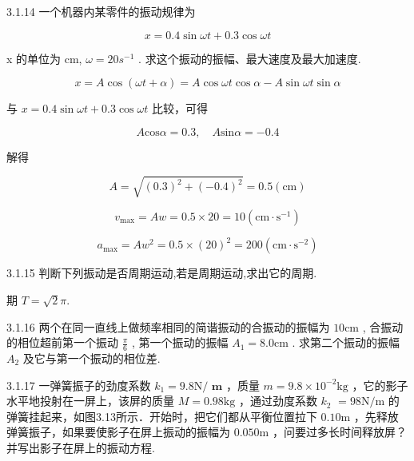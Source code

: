 \begin{problem}{3.1.14}
一个机器内某零件的振动规律为

\[
x = 0. 4 \sin \omega t + 0. 3 \cos \omega t
\]

x 的单位为 cm, $\omega = 20s^{-1}$ . 求这个振动的振幅、最大速度及最大加速度.

\[
x = A \cos (\omega t + \alpha) = A \cos \omega t \cos \alpha - A \sin \omega t \sin \alpha
\]

与 $x = 0.4\sin \omega t + 0.3\cos \omega t$ 比较，可得

\[
A \mathrm{cos} \alpha = 0. 3, \quad A \mathrm{sin} \alpha = - 0. 4
\]

解得

\[
A = \sqrt {(0 . 3) ^ {2} + (- 0 . 4) ^ {2}} = 0. 5 (\mathrm{cm})
\]

\[
v _ {\max} = A w = 0. 5 \times 2 0 = 1 0 (\mathrm{cm} \cdot \mathrm{s} ^ {- 1})
\]

\[
a _ {\max} = A w ^ {2} = 0. 5 \times (2 0) ^ {2} = 2 0 0 (\mathrm{cm} \cdot \mathrm{s} ^ {- 2})
\]
\end{problem}
\clearpage


\begin{problem}{3.1.15}
判断下列振动是否周期运动,若是周期运动,求出它的周期.

期 $T = \sqrt{2}\pi .$
\end{problem}
\clearpage


\begin{problem}{3.1.16}
两个在同一直线上做频率相同的简谐振动的合振动的振幅为 $10\mathrm{cm}$ , 合振动的相位超前第一个振动 $\frac{\pi}{6}$ , 第一个振动的振幅 $A_{1} = 8.0\mathrm{cm}$ . 求第二个振动的振幅 $A_{2}$ 及它与第一个振动的相位差.
\end{problem}
\clearpage


\begin{problem}{3.1.17}
一弹簧振子的劲度系数 $k_{1} = 9.8\mathrm{N}/$ $\mathbf{m}$ ，质量 $m = 9.8\times 10^{-2}\mathrm{kg}$ ，它的影子水平地投射在一屏上，该屏的质量 $M = 0.98\mathrm{kg}$ ，通过劲度系数 $k_{2}$ $= 98\mathrm{N / m}$ 的弹簧挂起来，如图3.13所示．开始时，把它们都从平衡位置拉下 $0.10\mathrm{m}$ ，先释放弹簧振子，如果要使影子在屏上振动的振幅为 $0.050\mathrm{m}$ ，问要过多长时间释放屏？并写出影子在屏上的振动方程.
\begin{center}

\end{center}
\end{problem}
\clearpage


